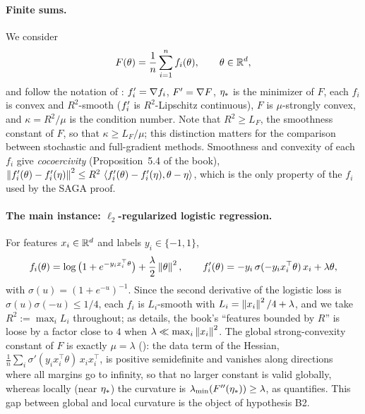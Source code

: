\paragraph{Finite sums.}
We consider
\begin{equation}\label{eq:finite-sum}
  F(\theta) = \frac1n \sum_{i=1}^n f_i(\theta), \qquad \theta \in \mathbb{R}^d,
\end{equation}
and follow the notation of \cite{bach2024learning}: $f'_i = \nabla f_i$, $F' = \nabla F$, $\eta_\ast$ is the
minimizer of $F$, each $f_i$ is convex and $R^2$-smooth ($f'_i$ is $R^2$-Lipschitz continuous), $F$ is
$\mu$-strongly convex, and $\kappa = R^2/\mu$ is the condition number. Note that $R^2 \ge L_F$, the smoothness
constant of $F$, so that $\kappa \ge L_F/\mu$; this distinction matters for the comparison between stochastic and
full-gradient methods. Smoothness and convexity of each $f_i$ give \emph{cocoercivity}
(Proposition~5.4 of the book), $\left\|f'_i(\theta) - f'_i(\eta)\right\|^2 \le R^2\,\left\langle f'_i(\theta) - f'_i(\eta), \theta - \eta \right\rangle$,
which is the only property of the $f_i$ used by the SAGA proof.

\paragraph{The main instance: $\ell_2$-regularized logistic regression.}
For features $x_i \in \mathbb{R}^d$ and labels $y_i \in \{-1, 1\}$,
\begin{equation}\label{eq:logistic}
  f_i(\theta) = \log\big(1 + e^{-y_i x_i^\top \theta}\big) + \frac{\lambda}{2}\left\|\theta\right\|^2,
  \qquad
  f'_i(\theta) = -y_i\,\sigma(-y_i x_i^\top\theta)\,x_i + \lambda\theta,
\end{equation}
with $\sigma(u) = (1+e^{-u})^{-1}$. Since the second derivative of the logistic loss is $\sigma(u)\sigma(-u) \le 1/4$,
each $f_i$ is $L_i$-smooth with $L_i = \left\|x_i\right\|^2/4 + \lambda$, and we take \emph{$R^2 := \max_i L_i$}
throughout; as  details, the book's ``features bounded by $R$'' is loose by a factor close to $4$
when $\lambda\ll\max_i\left\|x_i\right\|^2$. The global strong-convexity constant of $F$ is exactly $\mu = \lambda$
(): the data term of the Hessian, $\frac1n\sum_i \sigma'(y_i x_i^\top\theta)\,x_i x_i^\top$,
is positive semidefinite and vanishes along directions where all margins go to infinity, so that no larger constant is
valid globally, whereas locally (near $\eta_\ast$) the curvature is $\lambda_{\min}(F''(\eta_\ast)) \ge \lambda$, as
 quantifies. This gap between global and local curvature is the object of hypothesis B2.

